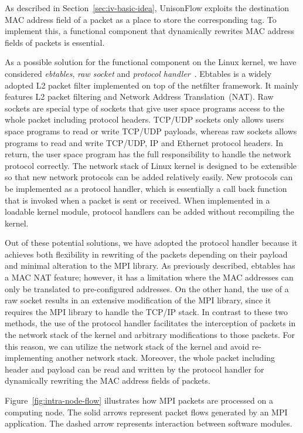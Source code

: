 As described in Section~\ref{sec:iv-basic-idea}, UnisonFlow exploits the
destination MAC address field of a packet as a place to store the
corresponding tag. To implement this, a functional component that
dynamically rewrites MAC address fields of packets is essential.

As a possible solution for the functional component on the Linux kernel,
we have considered \emph{ebtables}, \emph{raw socket} and \emph{protocol
handler}~\autocite{Rosen2013}. Ebtables is a widely adopted L2 packet filter
implemented on top of the netfilter framework. It mainly features L2 packet
filtering and Network Address Translation~(NAT). Raw sockets are special type
of sockets that give user space programs access to the whole packet including
protocol headers. TCP/UDP sockets only allows users space programs to read or
write TCP/UDP payloads, whereas raw sockets allows programs to read and write
TCP/UDP, IP and Ethernet protocol headers. In return, the user space program
has the full responsibility to handle the network protocol correctly. The
network stack of Linux kernel is designed to be extensible so that new network
protocols can be added relatively easily. New protocols can be implemented
as a protocol handler, which is essentially a call back function that is
invoked when a packet is sent or received. When implemented in a loadable
kernel module, protocol handlers can be added without recompiling the kernel.

Out of these potential solutions,
we have adopted the protocol handler because it achieves both
flexibility in rewriting of the packets depending on their payload and
minimal alteration to the MPI library. As previously described, ebtables
has a MAC NAT feature; however, it has a limitation where the MAC
addresses can only be translated to pre-configured addresses. On the
other hand, the use of a raw socket results in an extensive modification
of the MPI library, since it requires the MPI library to handle the
TCP/IP stack. In contrast to these two methods, the use of the protocol
handler facilitates the interception of packets in the network stack of
the kernel and arbitrary modifications to those packets. For this
reason, we can utilize the network stack of the kernel and avoid
re-implementing another network stack. Moreover, the whole packet
including header and payload can be read and written by the protocol
handler for dynamically rewriting the MAC address fields of packets.

Figure~\ref{fig:intra-node-flow} illustrates how MPI packets are
processed on a computing node. The solid arrows represent packet flows
generated by an MPI application. The dashed arrow represents interaction
between software modules.

